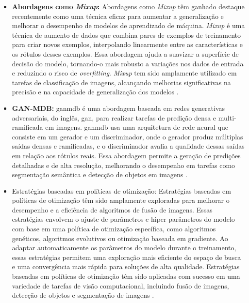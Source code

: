 \begin{itemize}
    \item \textbf{Abordagens como \textit{Mixup}:} Abordagens como \textit{Mixup} têm ganhado destaque recentemente como uma técnica eficaz para aumentar a generalização e melhorar o desempenho de modelos de aprendizado de máquina. \textit{Mixup} é uma técnica de aumento de dados que combina pares de exemplos de treinamento para criar novos exemplos, interpolando linearmente entre as características e os rótulos desses exemplos. Essa abordagem ajuda a suavizar a superfície de decisão do modelo, tornando-o mais robusto a variações nos dados de entrada e reduzindo o risco de \textit{overfitting}. \textit{Mixup} tem sido amplamente utilizado em tarefas de classificação de imagens, alcançando melhorias significativas na precisão e na capacidade de generalização dos modelos \cite{zhang2017mixup}.
    \item \textbf{GAN-MDB: }\gls{ganmdb} é uma abordagem baseada em redes generativas adversariais, do inglês,  \gls{gan}, para realizar tarefas de predição densa e multi-ramificada em imagens. \gls{ganmdb} usa uma arquitetura de rede neural que consiste em um gerador e um discriminador, onde o gerador produz múltiplas saídas densas e ramificadas, e o discriminador avalia a qualidade dessas saídas em relação aos rótulos reais. Essa abordagem permite a geração de predições detalhadas e de alta resolução, melhorando o desempenho em tarefas como segmentação semântica e detecção de objetos em imagens \cite{fan2019ganmbd}.
    \item Estratégias baseadas em políticas de otimização: Estratégias baseadas em políticas de otimização têm sido amplamente exploradas para melhorar o desempenho e a eficiência de algoritmos de fusão de imagens. Essas estratégias envolvem o ajuste de parâmetros e hiper parâmetros do modelo com base em uma política de otimização específica, como algoritmos genéticos, algoritmos evolutivos ou otimização baseada em gradiente. Ao adaptar automaticamente os parâmetros do modelo durante o treinamento, essas estratégias permitem uma exploração mais eficiente do espaço de busca e uma convergência mais rápida para soluções de alta qualidade. Estratégias baseadas em políticas de otimização têm sido aplicadas com sucesso em uma variedade de tarefas de visão computacional, incluindo fusão de imagens, detecção de objetos e segmentação de imagens \cite{pmlr-v119-tian20a}.
\end{itemize}



